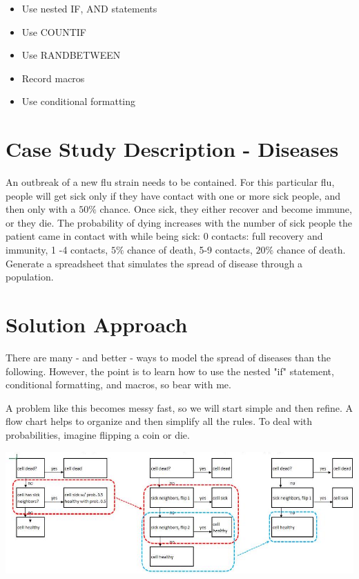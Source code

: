\documentclass[10pt]{article}
\begin{document}
\begin{itemize}
  \item Use nested IF, AND statements

  \item Use COUNTIF

  \item Use RANDBETWEEN

  \item Record macros

  \item Use conditional formatting

\end{itemize}
\section{Case Study Description - Diseases}
An outbreak of a new flu strain needs to be contained. For this particular flu, people will get sick only if they have contact with one or more sick people, and then only with a $50 \%$ chance. Once sick, they either recover and become immune, or they die. The probability of dying increases with the number of sick people the patient came in contact with while being sick: 0 contacts: full recovery and immunity, 1 -4 contacts, $5 \%$ chance of death, 5-9 contacts, $20 \%$ chance of death. Generate a spreadsheet that simulates the spread of disease through a population.

\section{Solution Approach}
There are many - and better - ways to model the spread of diseases than the following. However, the point is to learn how to use the nested "if" statement, conditional formatting, and macros, so bear with me.

A problem like this becomes messy fast, so we will start simple and then refine. A flow chart helps to organize and then simplify all the rules. To deal with probabilities, imagine flipping a coin or die.

\includegraphics[max width=\textwidth]{2022_07_05_5945264bba2a5f6ba667g-22}
\end{document}
